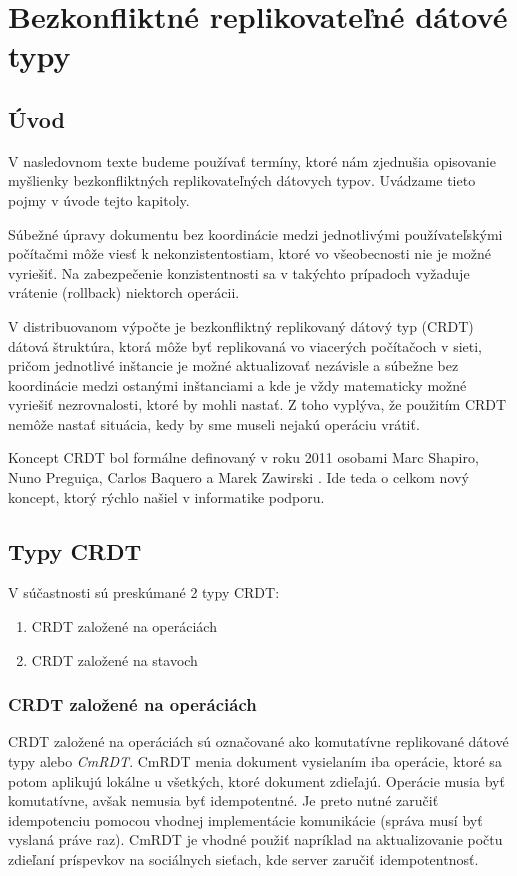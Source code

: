\chapter{Bezkonfliktné replikovateľné dátové typy}

\label{kap:cdrt} %

\section{Úvod}
V nasledovnom texte budeme používať termíny, ktoré nám zjednušia opisovanie myšlienky
bezkonfliktných replikovateľných dátovych typov. Uvádzame tieto pojmy v úvode tejto
kapitoly.

Súbežné úpravy dokumentu bez koordinácie medzi jednotlivými používateľskými
počítačmi môže viesť k nekonzistentostiam, ktoré vo všeobecnosti nie je možné
vyriešiť. Na zabezpečenie konzistentnosti sa v takýchto prípadoch vyžaduje vrátenie (rollback)
niektorch operácii.

V distribuovanom výpočte je bezkonfliktný replikovaný dátový typ (CRDT) dátová štruktúra,
ktorá môže byť replikovaná vo viacerých počítačoch v sieti, pričom jednotlivé inštancie je možné
aktualizovať nezávisle a súbežne bez koordinácie medzi ostanými inštanciami a kde je vždy
matematicky možné vyriešiť nezrovnalosti, ktoré by mohli nastať. Z toho vyplýva, že použitím
CRDT nemôže nastať situácia, kedy by sme museli nejakú operáciu vrátiť. 

Koncept CRDT bol formálne definovaný v roku 2011 osobami
Marc Shapiro, Nuno Preguiça, Carlos Baquero a Marek Zawirski \cite{crdt_definition}.
Ide teda o celkom nový koncept, ktorý rýchlo našiel v informatike podporu.

\section{Typy CRDT}
V súčastnosti sú preskúmané 2 typy CRDT:
\begin{enumerate}
  \item CRDT založené na operáciách
  \item CRDT založené na stavoch
\end{enumerate}

\subsection{CRDT založené na operáciách}
CRDT založené na operáciách sú označované ako komutatívne replikované dátové typy alebo 
\textit{CmRDT}. CmRDT menia dokument vysielaním iba operácie, ktoré sa potom aplikujú lokálne
u všetkých, ktoré dokument zdieľajú. Operácie musia byť komutatívne, avšak nemusia 
byť idempotentné. Je preto nutné zaručiť idempotenciu pomocou vhodnej implementácie
komunikácie (správa musí byť vyslaná práve raz). 
CmRDT je vhodné použiť napríklad na aktualizovanie počtu zdieľaní
príspevkov na sociálnych sieťach, kde server zaručiť idempotentnosť. 


